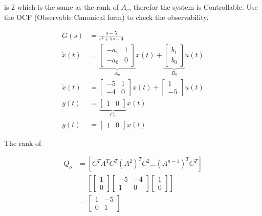 \documentclass[main.tex]{subfiles}
\begin{document}
\begin{enumerate}
\begin{enumerate}
    is 2 which is the same as the rank of $A_c$, therefor the system is Controllable. Use the OCF (Observable Canonical form) to check the observability.
    
    $$
    \begin{aligned}
    G(s) &= \frac{s-5}{s^2+5s+4}\\
    \dot{x}(t) &= \underbrace{\left[\begin{array}{ll}
    -a_1 & 1 \\
    -a_0 & 0
    \end{array}\right]}_{A_o} x(t)+\underbrace{\left[\begin{array}{l}
    b_1 \\
    b_0
    \end{array}\right]}_{B_0} u(t) \\
    \dot{x}(t) &= \left[\begin{array}{lll}
    -5 & 1 \\
    -4 & 0
    \end{array}\right] x(t) + \left[\begin{array}{l}
    1 \\
    -5
    \end{array}\right] u(t) \\
    y(t) &= \underbrace{\left[\begin{array}{lll}
    1 & 0
    \end{array}\right]}_{C_o} x(t) \\
    y(t) &= \left[\begin{array}{ll}
    1 & 0
    \end{array}\right] x(t)
    \end{aligned}
    $$
    
    The rank of
    
    $$
    \begin{aligned}
    Q_o &= \left[C^T A^T C^T\left(A^2\right)^T C^2 \ldots\left(A^{n-1}\right)^T C^T\right]\\
    &= \left[ \left[\begin{array}{l}
    1 \\
    0
    \end{array}\right] \left[\begin{array}{ll}
    -5 & -4 \\
    1 & 0
    \end{array}\right] \left[\begin{array}{l}
    1 \\ 0
    \end{array}\right] \right] \\
    & = \left[\begin{array}{ll}
    1 & -5 \\
    0 & 1
    \end{array}\right]
    \end{aligned}
    $$
    

\end{enumerate}
\end{enumerate}
\end{document}
